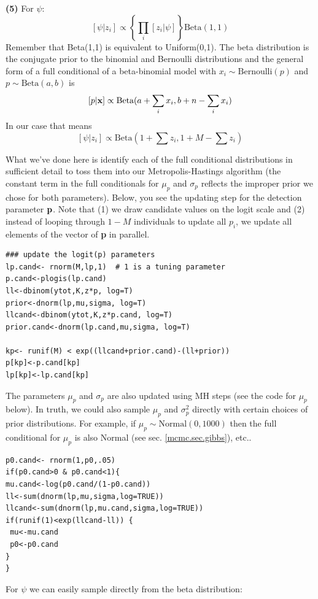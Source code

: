 {\bf (5)} For $\psi$:
\[
[\psi|z_{i}] \propto \left\{ \prod_{i} [z_{i}|\psi] \right\} \mbox{Beta}(1,1)
\]
Remember that \mbox{Beta}(1,1) is equivalent to \mbox{Uniform}(0,1). The beta distribution is the conjugate prior to the binomial and 
Bernoulli distributions and the general form of a full conditional of a beta-binomial model 
with $x_{i} \sim \mbox{Bernoulli} (p) $ and $p \sim \mbox{Beta}(a,b)$ is
\[
[p|{\bf x}] \propto \mbox{Beta}(a + \sum_i x_i, b + n-\sum_i x_i)
\]
In our case that means
\[
[\psi|z_{i}] \propto \mbox{Beta}(1 + \sum z_{i}, 1 + M - \sum z_{i})
\]

What we've done here is identify each of the full conditional
distributions in sufficient detail to toss them into our
Metropolis-Hastings algorithm (the constant term in the full
conditionals for $\mu_{p}$ and $\sigma_{p}$ reflects the improper
prior we chose for both parameters).  Below, you see the updating step
for the detection parameter ${\bf p}$. Note that (1) we draw candidate
values on the logit scale and (2) instead of looping through $1 - M$
individuals to update all $p_{i}$, we update all elements of the
vector of {\bf p} in parallel.

\begin{verbatim}
### update the logit(p) parameters
lp.cand<- rnorm(M,lp,1)  # 1 is a tuning parameter
p.cand<-plogis(lp.cand)
ll<-dbinom(ytot,K,z*p, log=T)
prior<-dnorm(lp,mu,sigma, log=T)
llcand<-dbinom(ytot,K,z*p.cand, log=T)
prior.cand<-dnorm(lp.cand,mu,sigma, log=T)

kp<- runif(M) < exp((llcand+prior.cand)-(ll+prior))
p[kp]<-p.cand[kp]
lp[kp]<-lp.cand[kp]
\end{verbatim}

The parameters $\mu_{p}$ and $\sigma_{p}$ are also updated using MH steps (see the code for $\mu_{p}$ below). In truth, we could also sample $\mu_{p}$
and $\sigma_{p}^{2}$ directly with certain choices of prior
distributions. For example, if $\mu_{p} \sim \mbox{Normal}(0, 1000)$
then the full conditional for $\mu_{p}$ is also Normal (see
sec. \ref{mcmc.sec.gibbs}), etc..

\begin{verbatim}
p0.cand<- rnorm(1,p0,.05)
if(p0.cand>0 & p0.cand<1){
mu.cand<-log(p0.cand/(1-p0.cand))
ll<-sum(dnorm(lp,mu,sigma,log=TRUE))
llcand<-sum(dnorm(lp,mu.cand,sigma,log=TRUE))
if(runif(1)<exp(llcand-ll)) {
 mu<-mu.cand
 p0<-p0.cand
}
}
\end{verbatim}

For $\psi$ we can easily sample directly from the beta distribution:

